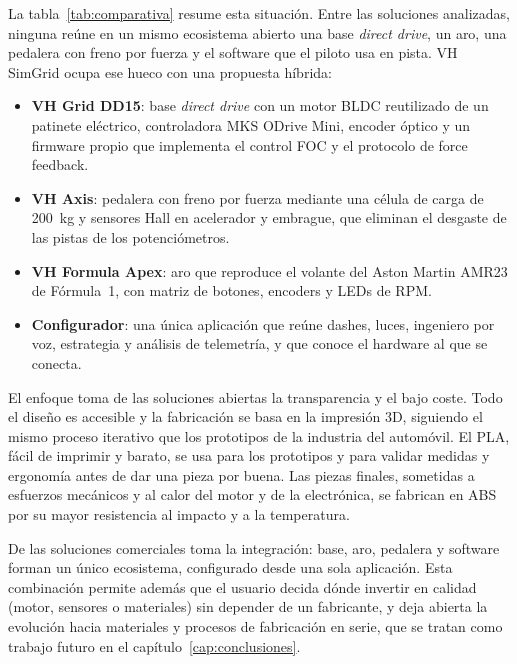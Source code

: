 La tabla~\ref{tab:comparativa} resume esta situación. Entre las soluciones analizadas, ninguna reúne en un mismo ecosistema abierto una base \textit{direct drive}, un aro, una pedalera con freno por fuerza y el software que el piloto usa en pista. VH SimGrid ocupa ese hueco con una propuesta híbrida:
\begin{itemize}
	\item \textbf{VH Grid DD15}: base \textit{direct drive} con un motor BLDC reutilizado de un patinete eléctrico, controladora MKS ODrive Mini, encoder óptico y un firmware propio que implementa el control FOC y el protocolo de force feedback.
	\item \textbf{VH Axis}: pedalera con freno por fuerza mediante una célula de carga de 200~kg y sensores Hall en acelerador y embrague, que eliminan el desgaste de las pistas de los potenciómetros.
	\item \textbf{VH Formula Apex}: aro que reproduce el volante del Aston Martin AMR23 de Fórmula~1, con matriz de botones, encoders y LEDs de RPM.
	\item \textbf{Configurador}: una única aplicación que reúne dashes, luces, ingeniero por voz, estrategia y análisis de telemetría, y que conoce el hardware al que se conecta.
\end{itemize}

El enfoque toma de las soluciones abiertas la transparencia y el bajo coste. Todo el diseño es accesible y la fabricación se basa en la impresión 3D, siguiendo el mismo proceso iterativo que los prototipos de la industria del automóvil. El PLA, fácil de imprimir y barato, se usa para los prototipos y para validar medidas y ergonomía antes de dar una pieza por buena. Las piezas finales, sometidas a esfuerzos mecánicos y al calor del motor y de la electrónica, se fabrican en ABS por su mayor resistencia al impacto y a la temperatura.

De las soluciones comerciales toma la integración: base, aro, pedalera y software forman un único ecosistema, configurado desde una sola aplicación. Esta combinación permite además que el usuario decida dónde invertir en calidad (motor, sensores o materiales) sin depender de un fabricante, y deja abierta la evolución hacia materiales y procesos de fabricación en serie, que se tratan como trabajo futuro en el capítulo~\ref{cap:conclusiones}.





